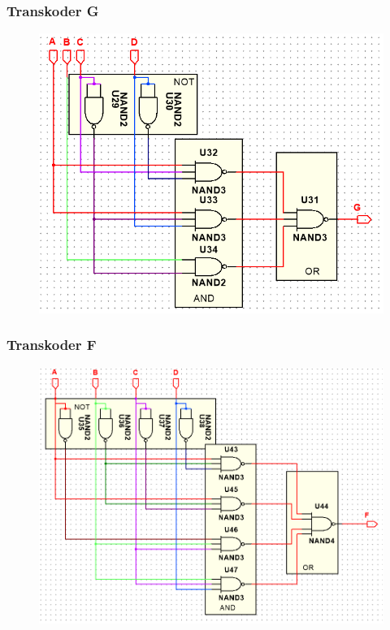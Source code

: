 \documentclass[a4paper]{article}
\begin{document}
\subsubsection{Transkoder G}
\begin{figure}[H]
 \centering
 \includegraphics{schemat_G.png}
\end{figure}

\subsubsection{Transkoder F}
\begin{figure}[H]
 \centering
 \includegraphics{schemat_F.png}
\end{figure}
\end{document}
